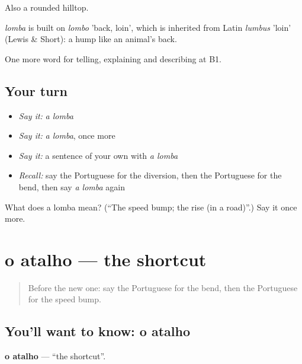 Also a rounded hilltop.

\begin{cousinweb}
\emph{lomba} is built on \emph{lombo} 'back, loin', which is inherited from Latin \emph{lumbus} 'loin' (Lewis \& Short): a hump like an animal's back.
\end{cousinweb}

\begin{grammarlens}[title={What you've built}]
One more word for telling, explaining and describing at B1.
\end{grammarlens}

\subsection*{Your turn}
\begin{itemize}
\raggedright
  \item \emph{Say it:} \emph{a lomba}
  \item \emph{Say it:} \emph{a lomba}, once more
  \item \emph{Say it:} a sentence of your own with \emph{a lomba}
  \item \emph{Recall:} say the Portuguese for the diversion, then the Portuguese for the bend, then say \emph{a lomba} again
\end{itemize}

\begin{tcolorbox}[breakable,colback=teal!4,colframe=teal!35!black,title={Before you move on}]
What does a lomba mean? (\textquotedblleft{}The speed bump; the rise (in a road)\textquotedblright{}.) Say it once more.
\end{tcolorbox}
\section[o atalho]{o atalho — the shortcut}

\label{lesson:PT-C410-atalho}



\begin{quote}
Before the new one: say the Portuguese for the bend, then the Portuguese for the speed bump.
\end{quote}

\subsection*{You'll want to know: o atalho}
\textbf{o atalho} — \textquotedblleft{}the shortcut\textquotedblright{}.

